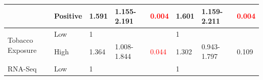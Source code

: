 \documentclass[jpm,article,submit,moreauthors,pdftex]{Definitions/mdpi}
\begin{document}
\begin{table}[hp]
{\begin{tabular}{|l|l|l|l|l|l|l|l|}
\cline{2-8}
                                        & Positive                                                                            & 1.591                                                                          & 1.155-2.191                                                                   & \textcolor{red}{0.004}                                                        & 1.601                                                                          & 1.159-2.211                                                                   & \textcolor{red}{0.004}                                                         \\ 
\hline
\multirow{2}{*}{Tobacco Exposure}       & {\cellcolor[rgb]{0.62,0.812,0.878}}Low                                              & {\cellcolor[rgb]{0.62,0.812,0.878}}1                                           & {\cellcolor[rgb]{0.62,0.812,0.878}}                                           & {\cellcolor[rgb]{0.62,0.812,0.878}}                                           & {\cellcolor[rgb]{0.62,0.812,0.878}}1                                           & {\cellcolor[rgb]{0.62,0.812,0.878}}                                           & {\cellcolor[rgb]{0.62,0.812,0.878}}                                            \\ 
\cline{2-8}
                                        & High                                                                                & 1.364                                                                          & 1.008-1.844                                                                   & \textcolor{red}{0.044}                                                        & 1.302                                                                          & 0.943-1.797                                                                   & 0.109                                                                          \\ 
\hline
\multirow{2}{*}{RNA-Seq}                & {\cellcolor[rgb]{0.62,0.812,0.878}}Low                                              & {\cellcolor[rgb]{0.62,0.812,0.878}}1                                           & {\cellcolor[rgb]{0.62,0.812,0.878}}                                           & {\cellcolor[rgb]{0.62,0.812,0.878}}                                           & {\cellcolor[rgb]{0.62,0.812,0.878}}1                                           & {\cellcolor[rgb]{0.62,0.812,0.878}}                                           & {\cellcolor[rgb]{0.62,0.812,0.878}}                                            \\ 

\end{tabular}}
\end{table}
\end{document}
